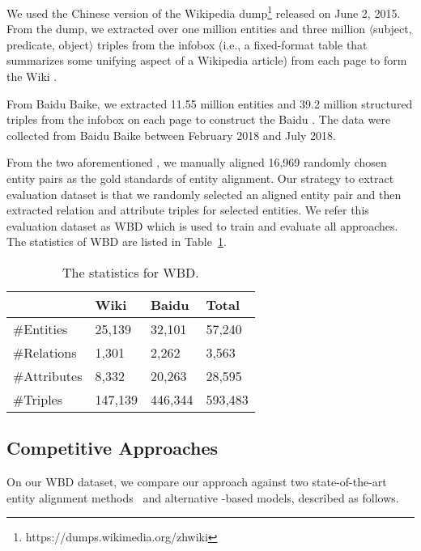 	We used the Chinese version of the Wikipedia dump\footnote{https://dumps.wikimedia.org/zhwiki} released on June 2, 2015.
    From the dump, we extracted over one million entities and three million $\langle$subject, predicate, object$\rangle$ triples from the infobox (i.e., a fixed-format table that summarizes some unifying aspect of a Wikipedia article) from each page to form the Wiki \KG.
	
	 From Baidu Baike, we extracted 11.55 million entities and 39.2 million structured triples from the infobox on each page to construct the Baidu \KG. 
	The data were collected from Baidu Baike between February 2018 and July 2018.

	
	 From the two aforementioned \KGs, we manually aligned 16,969 randomly chosen entity pairs as the gold standards of entity alignment. 
	Our strategy to extract evaluation dataset is that we randomly selected an aligned entity pair and then extracted relation and attribute triples for selected entities. 
	We refer this evaluation dataset as WBD which is used to train and evaluate all approaches. The statistics of WBD are listed in Table~\ref{dataset}.
	

	\begin{table}
		\centering
		\scriptsize
		\begin{tabular}{llll}
			\toprule
			& Wiki & Baidu & Total \\
			\midrule
			\#Entities & 25,139 & 32,101 & 57,240 \\
			\#Relations & 1,301 & 2,262 & 3,563 \\
			\#Attributes & 8,332 & 20,263 & 28,595 \\
			\#Triples & 147,139 & 446,344 & 593,483 \\
			\bottomrule
		\end{tabular}
		\caption{The statistics for WBD.}
		\label{dataset}
	\end{table}
	
	\subsection{Competitive Approaches}
	On our WBD dataset, we compare our approach against two state-of-the-art entity alignment methods~\cite{hao2016joint,zhu2017iterative} and alternative \GCN-based models, described as follows.

